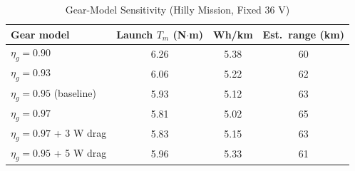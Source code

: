 \documentclass[journal]{IEEEtran}
\begin{document}
\begin{table}[!t]
\caption{Gear-Model Sensitivity (Hilly Mission, Fixed 36 V)}
\label{tab:gear}
\centering
\renewcommand{\arraystretch}{1.08}
\setlength{\tabcolsep}{3.5pt}
\begin{tabular}{l c c c}
\hline
Gear model & Launch $T_m$ (N$\cdot$m) & Wh/km & Est.\ range (km)\\
\hline
$\eta_g=0.90$ & 6.26 & 5.38 & 60\\
$\eta_g=0.93$ & 6.06 & 5.22 & 62\\
$\eta_g=0.95$ (baseline) & 5.93 & 5.12 & 63\\
$\eta_g=0.97$ & 5.81 & 5.02 & 65\\
$\eta_g=0.97$ + 3 W drag & 5.83 & 5.15 & 63\\
$\eta_g=0.95$ + 5 W drag & 5.96 & 5.33 & 61\\
\hline
\end{tabular}
\end{table}
\end{document}
